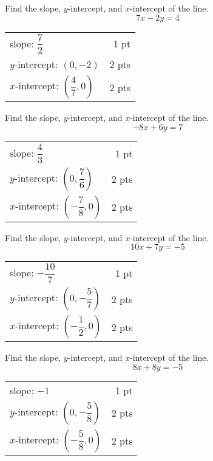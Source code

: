 {
      Find the slope, $y$-intercept, and $x$-intercept of the line. $$7x-2y=4$$
}
{
	\begin{tabular}{l r}
	slope: $\dfrac{7}{2}$ & 1 pt \\
	$y$-intercept: $(0,-2)$ & 2 pts\\
	$x$-intercept: $\left(\dfrac{4}{7},0\right)$ & 2 pts\\
	\end{tabular}
}

{
      Find the slope, $y$-intercept, and $x$-intercept of the line. $$-8x+6y=7$$
}
{
	\begin{tabular}{l r}
	slope: $\dfrac{4}{3}$ & 1 pt \\
	$y$-intercept: $\left(0,\dfrac{7}{6}\right)$ & 2 pts\\
	$x$-intercept: $\left(-\dfrac{7}{8},0\right)$ & 2 pts\\
	\end{tabular}
}

{
      Find the slope, $y$-intercept, and $x$-intercept of the line. $$10x+7y=-5$$
}
{
	\begin{tabular}{l r}
	slope: $-\dfrac{10}{7}$ & 1 pt \\
	$y$-intercept: $\left(0,-\dfrac{5}{7}\right)$ & 2 pts\\
	$x$-intercept: $\left(-\dfrac{1}{2},0\right)$ & 2 pts\\
	\end{tabular}
}

{
      Find the slope, $y$-intercept, and $x$-intercept of the line. $$8x+8y=-5$$
}
{
	\begin{tabular}{l r}
	slope: $-1$ & 1 pt \\
	$y$-intercept: $\left(0,-\dfrac{5}{8}\right)$ & 2 pts\\
	$x$-intercept: $\left(-\dfrac{5}{8},0\right)$ & 2 pts\\
	\end{tabular}
}
